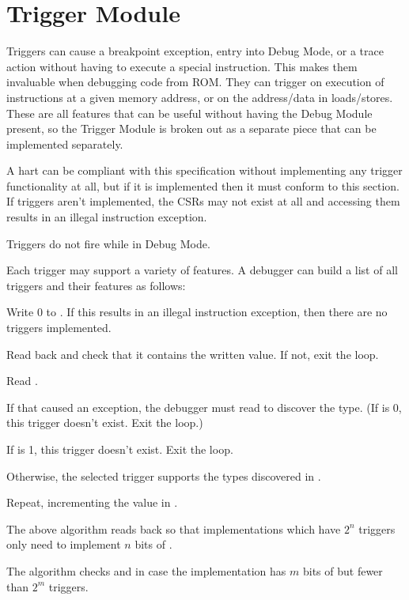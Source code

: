 \chapter{Trigger Module}
\label{sec:trigger}

Triggers can cause a breakpoint exception, entry into Debug Mode, or a trace action
without having to execute a special instruction. This makes them invaluable
when debugging code from ROM. They can trigger on execution of instructions at
a given memory address, or on the address/data in loads/stores.  These are all
features that can be useful without having the Debug Module present, so the
Trigger Module is broken out as a separate piece that can be implemented
separately.

A hart can be compliant with this specification without implementing any
trigger functionality at all, but if it is implemented then it must conform to
this section. If triggers aren't implemented, the CSRs may not exist at all and
accessing them results in an illegal instruction exception.

Triggers do not fire while in Debug Mode.

\begin{steps}{Each trigger may support a variety of features. A debugger can
    build a list of all triggers and their features as follows:}
\item Write 0 to \Rtselect. If this results in an illegal instruction
    exception, then there are no triggers implemented.
\item Read back \Rtselect and check that it contains the written value. If not,
    exit the loop.
\item Read \Rtinfo.
\item If that caused an exception, the debugger must read \Rtdataone to
    discover the type. (If \Ftype is 0, this trigger doesn't exist. Exit the
    loop.)
\item If \Finfo is 1, this trigger doesn't exist. Exit the loop.
\item Otherwise, the selected trigger supports the types discovered in \Finfo.
\item Repeat, incrementing the value in \Rtselect.
\end{steps}

\begin{commentary}
    The above algorithm reads back \Rtselect so that implementations which have
    $2^n$ triggers only need to implement $n$ bits of \Rtselect.

    The algorithm checks \Rtinfo and \Ftype in case the implementation has $m$
    bits of \Rtselect but fewer than $2^m$ triggers.
\end{commentary}

